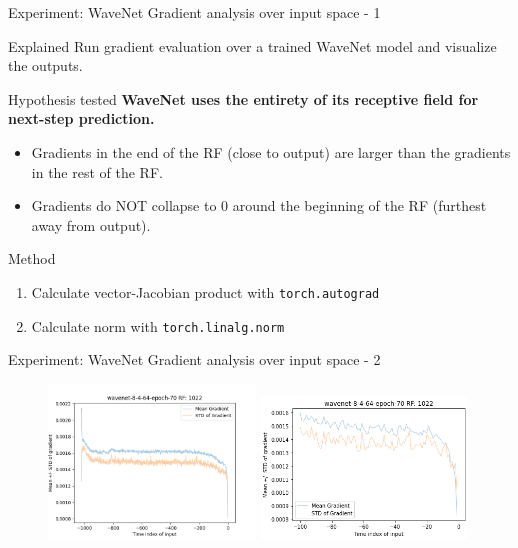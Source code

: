 \documentclass[
  ignorenonframetext,
  aspectratio=169,
]{beamer}
\providecommand{\tightlist}{%
  \setlength{\itemsep}{0pt}\setlength{\parskip}{0pt}}
\begin{document}
\begin{frame}[fragile]{Experiment: WaveNet Gradient analysis over input
space - 1}
\protect\hypertarget{experiment-wavenet-gradient-analysis-over-input-space---1}{}
\begin{block}{Explained}
\protect\hypertarget{explained}{}
Run gradient evaluation over a trained WaveNet model and visualize the
outputs.
\end{block}

\begin{block}{Hypothesis tested}
\protect\hypertarget{hypothesis-tested-4}{}
\textbf{WaveNet uses the entirety of its receptive field for next-step
prediction.}

\begin{itemize}
\item
  Gradients in the end of the RF (close to output) are larger than the
  gradients in the rest of the RF.
\item
  Gradients do NOT collapse to 0 around the beginning of the RF
  (furthest away from output).
\end{itemize}
\end{block}

\begin{block}{Method}
\protect\hypertarget{method}{}
\begin{enumerate}
\tightlist
\item
  Calculate vector-Jacobian product with \texttt{torch.autograd}
\item
  Calculate norm with \texttt{torch.linalg.norm}
\end{enumerate}
\end{block}
\end{frame}

\begin{frame}{Experiment: WaveNet Gradient analysis over input space -
2}
\protect\hypertarget{experiment-wavenet-gradient-analysis-over-input-space---2}{}
\begin{figure}[ht]
            \includegraphics[width=0.49\textwidth]{gfx/wavenet-8-4-64-epoch-70-gradients.png}%
            \includegraphics[width=0.49\textwidth]{gfx/wavenet-8-4-64-epoch-70-gradients-zoom.png}
\end{figure}
\end{frame}
\end{document}
